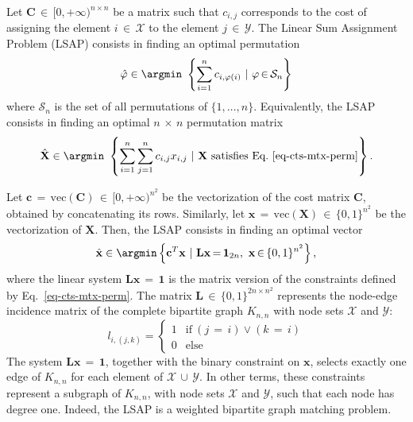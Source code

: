 \begin{definition}\label{def:lsap}
Let $\mathbf{C}\,{\in}\,[0,{+\infty})^{n\times n}$ be a matrix such that $c_{i,j}$ corresponds to the cost of assigning the element $i\,{\in}\,\mathcal{X}$ to the element $j\,{\in}\,\mathcal{Y}$. The Linear Sum Assignment Problem (LSAP) consists in finding
an optimal permutation 
\begin{equation}
\hat{\varphi}\in{\argmin}~\left\lbrace\sum_{i=1}^nc_{i,\varphi(i)}~|~\varphi\,{\in}\,\mathcal{S}_n\right\rbrace
\end{equation}
where $\mathcal{S}_n$ is the set of all permutations of $\{1,\ldots,n\}$. Equivalently, the LSAP consists in finding an optimal $n\,{\times}\,n$ permutation matrix
\begin{equation}
\hat{\mathbf{X}}\in\argmin~\left\{\sum_{i=1}^n\sum_{j=1}^n c_{i,j} x_{i,j}~|~\mathbf{X}~\text{satisfies Eq.~\ref{eq-cts-mtx-perm}}\right\}.
\end{equation}
\end{definition}


Let $\mathbf{c}\,{=}\,\text{vec}(\mathbf{C})\,{\in}\,[0,{+\infty})^{n^2}$ be the vectorization of the cost matrix $\mathbf{C}$, obtained by concatenating its rows. Similarly, let $\mathbf{x}\,{=}\,\text{vec}(\mathbf{X})\,{\in}\,\{0,1\}^{n^2}$ be the vectorization of $\mathbf{X}$. Then, the LSAP consists in finding an optimal vector
\begin{equation}\label{eq:lsap_formulation}
  \hat{\mathbf{x}}\in\argmin\left\{\mathbf{c}^T\mathbf{x}~|~\mathbf{L}\mathbf{x}\,{=}\,\mathbf{1}_{2n},~\mathbf{x}\,{\in}\,\{0,1\}^{n^2}\right\},
\end{equation}
where the linear system $\mathbf{L}\mathbf{x}\,{=}\,\mathbf{1}$ is the matrix version of the constraints defined by Eq.~\ref{eq-cts-mtx-perm}. The matrix $\mathbf{L}\,{\in}\,\{0,1\}^{2n\times n^2}$ represents the node-edge incidence matrix of the complete bipartite graph $K_{n,n}$ with node sets $\mathcal{X}$ and $\mathcal{Y}$:
\begin{equation}
	l_{i,(j,k)}=\begin{cases}
	1&\text{if}~(j\,{=}\,i)\vee(k\,{=}\,i)\\
	0&\text{else}
	\end{cases}
\end{equation}
The system $\mathbf{L}\mathbf{x}\,{=}\,\mathbf{1}$, together with the binary constraint on $\mathbf{x}$, selects exactly one edge of $K_{n,n}$ for each element of $\mathcal{X}\,{\cup}\,\mathcal{Y}$. In other terms, these constraints represent a subgraph of $K_{n,n}$, with node sets $\mathcal{X}$ and $\mathcal{Y}$, such that each node has degree one. Indeed, the LSAP is a weighted bipartite graph matching problem.

